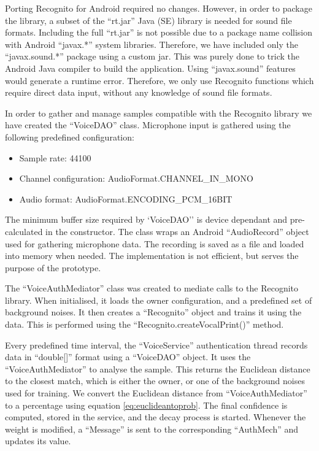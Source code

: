 Porting Recognito for Android required no changes. However, in order to package the library, a subset of the ``rt.jar'' Java (SE) library is needed for sound file formats. Including the full ``rt.jar'' is not possible due to a package name collision with Android ``javax.*'' system libraries. Therefore, we have included only the ``javax.sound.*'' package using a custom jar. This was purely done to trick the Android Java compiler to build the application. Using ``javax.sound'' features would generate a runtime error. Therefore, we only use Recognito functions which require direct data input, without any knowledge of sound file formats.

In order to gather and manage samples compatible with the Recognito library we have created the ``VoiceDAO'' class. Microphone input is gathered using the following predefined configuration:
\begin{itemize}
	\item Sample rate: 44100
	\item Channel configuration: AudioFormat.CHANNEL\_IN\_MONO
	\item Audio format: AudioFormat.ENCODING\_PCM\_16BIT
\end{itemize}

The minimum buffer size required by `VoiceDAO'' is device dependant and pre-calculated in the constructor. The class wraps an Android ``AudioRecord'' object used for gathering microphone data. The recording is saved as a file and loaded into memory when needed. The implementation is not efficient, but serves the purpose of the prototype.

The ``VoiceAuthMediator'' class was created to mediate calls to the Recognito library. When initialised, it loads the owner configuration, and a predefined set of background noises. It then creates a ``Recognito'' object and trains it using the data. This is performed using the ``Recognito.createVocalPrint()'' method.

Every predefined time interval, the ``VoiceService'' authentication thread records data in ``double[]'' format using a ``VoiceDAO'' object. It uses the ``VoiceAuthMediator'' to analyse the sample. This returns the Euclidean distance to the closest match, which is either the owner, or one of the background noises used for training. We convert the Euclidean distance from ``VoiceAuthMediator'' to a percentage using equation \ref{eq:euclideantoprob}. The final confidence is computed, stored in the service, and the decay process is started. Whenever the weight is modified, a ``Message'' is sent to the corresponding ``AuthMech'' and updates its value. 
 
